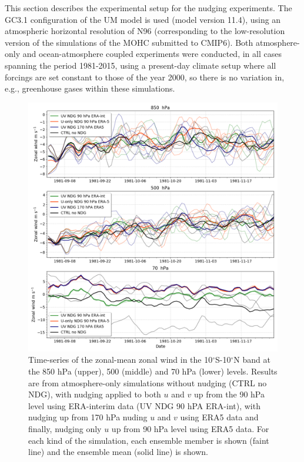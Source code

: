 This section describes the experimental setup for the nudging experiments. 
The GC3.1 configuration of the UM model is used (model version 11.4), using an atmospheric horizontal resolution of N96 (corresponding to the low-resolution version of the simulations of the MOHC submitted to CMIP6). 
Both atmosphere-only and ocean-atmosphere coupled experiments were conducted, in all cases spanning the period 1981-2015, using a present-day climate setup where all forcings are set constant to those of the year 2000, so there is no variation in, e.g., greenhouse gases within these simulations.


\begin{figure}[t!]
\centering
 \includegraphics[width=\linewidth]{figures/u_test__.png}
\caption[Time-series of zonal-mean winds under different nudging conditions]{Time-series of the zonal-mean zonal wind in the 10$^\circ$S-10$^\circ$N band at the 850 hPa (upper), 500 (middle) and 70 hPa (lower) levels. Results are from atmosphere-only simulations without nudging (CTRL no NDG), with nudging applied to both $u$ and $v$ up from the 90 hPa level using ERA-interim data (UV NDG 90 hPA ERA-int), with nudging up from 170 hPa nuding $u$ and $v$ using ERA5 data and finally, nudging only $u$ up from 90 hPa level using ERA5 data. For each kind of the simulation, each ensemble member is shown (faint line) and the ensemble mean (solid line) is shown. }
\label{fig:u_nudg_stv}
\end{figure}

